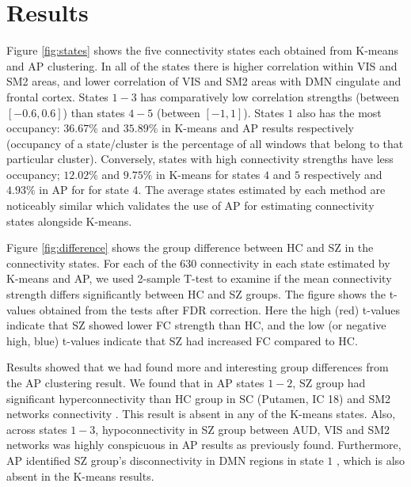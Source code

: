 \documentclass{article}
\begin{document}
\section{Results}
\label{sec:Results}

Figure \ref{fig:states} shows the five connectivity states each obtained from K-means and \ac{AP} clustering. In all of the states there is higher correlation within \ac{VIS} and \ac{SM2} areas, and lower correlation of \ac{VIS} and \ac{SM2} areas with \ac{DMN} cingulate and frontal cortex. States $1-3$ has comparatively low correlation strengths (between $[-0.6, 0.6]$) than states $4-5$ (between $[- 1, 1]$). States $1$ also has the most occupancy: $36.67\%$ and $35.89\%$ in K-means and \ac{AP} results respectively (occupancy of a state/cluster is the percentage of all windows that belong to that particular cluster). Conversely, states with high connectivity strengths have less occupancy; $12.02\%$ and $9.75\%$ in K-means for states $4$ and $5$ respectively and $4.93\%$ in \ac{AP} for for state $4$. The average states estimated by each method are noticeably similar which validates the use of \ac{AP} for estimating connectivity states alongside K-means.

Figure \ref{fig:difference} shows the group difference between \ac{HC} and \ac{SZ} in the connectivity states. For each of the $630$ connectivity in each state estimated by K-means and \ac{AP}, we used 2-sample T-test to examine if the mean connectivity strength differs significantly between \ac{HC} and \ac{SZ} groups. The figure shows the t-values obtained from the tests after \ac{FDR} correction. Here the high (red) t-values indicate that \ac{SZ} showed lower \ac{FC} strength than \ac{HC}, and the low (or negative high, blue) t-values indicate that \ac{SZ} had increased \ac{FC} compared to \ac{HC}.

Results showed that we had found more and interesting group differences from the \ac{AP} clustering result. We found that in \ac{AP} states $1-2$, \ac{SZ} group had significant hyperconnectivity than \ac{HC} group in \acl{SC} (Putamen, \acs{IC} 18) and \acl{SM2} networks connectivity \cite{damaraju_dynamic_2014}. This result is absent in any of the K-means states. Also, across states $1-3$, hypoconnectivity in \ac{SZ} group between \ac{AUD}, \ac{VIS} and \ac{SM2} networks was highly conspicuous in \ac{AP} results as previously found. Furthermore, \ac{AP} identified \ac{SZ} group's disconnectivity in \ac{DMN} regions in state $1$ \cite{du_interaction_2016}, which is also absent in the K-means results.
\end{document}
